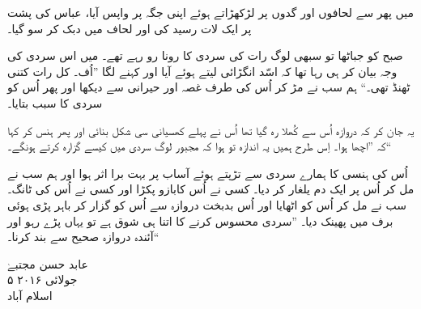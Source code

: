\documentclass{article}
\begin{document}
میں پھر سے لحافوں اور گدوں پر لڑکھڑاتے ہوئے اپنی جگہ پر واپس آیا، عباس کی پشت پر ایک لات رسید کی اور لحاف میں دبک کر سو گیا۔

صبح کو جباٹھا تو سبھی لوگ رات کی سردی کا رونا رو رہے تھے۔ میں اس سردی کی وجہ بیان کر ہی رہا تھا کہ اسّد انگڑائی لیتے ہوئے آیا اور کہنے لگا ''اُف۔ کل رات کتنی ٹھنڈ تھی۔`` ہم سب نے مڑ کر اُس کی طرف غصہ اور حیرانی سے دیکھا اور پھر اُس کو سردی کا سبب بتایا۔

یہ جان کر کہ دروازہ اُس سے کُھلا رہ گیا تھا اُس نے پہلے کھسیانی سی شکل بنائی اور پھر ہنس کر کہا کہ ''اچھا ہوا۔ اِس طرح ہمیں یہ اندازہ تو ہوا کہ مجبور لوگ سردی میں کیسے گزارہ کرتے ہونگے۔``

اُس کی ہنسی کا ہمارے سردی سے تڑپتے ہوئے آساب پر بہت برا اثر ہوا اور ہم سب نے مل کر اُس پر ایک دم یلغار کر دیا۔ کسی نے اُس کابازو پکڑا اور کسی نے اُس کی ٹانگ۔ سب نے مل کر اُس کو اٹھایا اور اُس بدبخت دروازہ سے اُس کو گزار کر باہر پڑی ہوئی برف میں پھینک دیا۔ ''سردی محسوس کرنے کا اتنا ہی شوق ہے تو یہاں پڑے رہو اور آئندہ دروازہ صحیح سے بند کرنا۔``


\vspace{\baselineskip}
\begin{flushleft}
   عابد حسن مجتبےٰ\\
   ۵ جولائی ۲۰۱۶\\
   اسلام آباد
\end{flushleft}
\end{document}

